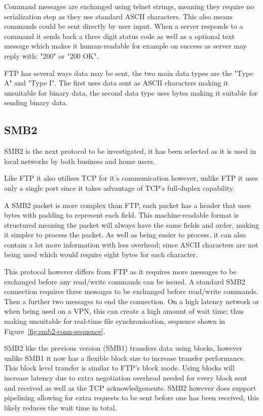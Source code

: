 Command messages are exchanged using telnet strings, meaning they require no serialization step as they use standard ASCII characters. This also means commands could be sent directly by user input. When a server responds to a command it sends back a three digit status code as well as a optional text message which makes it human-readable for example on success as server may reply with: "200" or "200 OK".

FTP has several ways data may be sent, the two main data types are the "Type A" and "Type I". The first uses data sent as ASCII characters making it unsuitable for binary data, the second data type uses bytes making it suitable for sending binary data.

\subsection*{SMB2}
SMB2 is the next protocol to be investigated, it has been selected as it is used in local networks by both business and home users.

Like FTP it also utilises TCP for it's communication however, unlike FTP it uses only a single port since it takes advantage of TCP's full-duplex capability.

A SMB2 packet is more complex than FTP, each packet has a header that uses bytes with padding to represent each field. This machine-readable format is structured meaning the packet will always have the same fields and order, making it simpler to process the packet. As well as being easier to process, it can also contain a lot more information with less overhead; since ASCII characters are not being used which would require eight bytes for each character.

This protocol however differs from FTP as it requires more messages to be exchanged before any read/write commands can be issued. A standard SMB2 connection requires three messages to be exchanged before read/write commands. Then a further two messages to end the connection. On a high latency network or when being used on a VPN, this can create a high amount of wait time; thus making unsuitable for real-time file synchronisation, sequence shown in Figure~\ref{fig:smb2-conn-sequence}.

SMB2 like the previous version (SMB1) transfers data using blocks, however unlike SMB1 it now has a flexible block size to increase transfer performance. This block level transfer is similar to FTP's block mode. Using blocks will increase latency due to extra negotiation overhead needed for every block sent and received as well as the TCP acknowledgements. SMB2 however does support pipelining allowing for extra requests to be sent before one has been received, this likely reduces the wait time in total.

